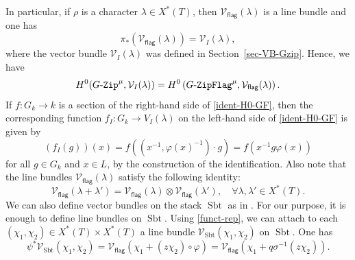 \documentclass[10pt,a4paper]{article}
\numberwithin{equation}{section}
\theoremstyle{definition}
\theoremstyle{remark}
\newcommand{\GZip}{\mathop{\text{$G$-{\tt Zip}}}\nolimits}
\newcommand{\flag}{\mathsf{flag}}
\newcommand{\GF}{\mathop{\text{$G$-{\tt ZipFlag}}}\nolimits}
\newcommand{\Vcal}{{\mathcal V}}
\DeclareMathOperator{\Sbt}{Sbt}
\begin{document}
In particular, if $\rho$ is a character $\lambda\in X^*(T)$, then $\Vcal_{\flag}(\lambda)$ is a line bundle and one has 
\begin{equation}\label{pushforward-lambda}
    \pi_*\left(\Vcal_{\flag}(\lambda)\right)=\Vcal_I(\lambda), 
\end{equation}
where the vector bundle $\Vcal_I(\lambda)$ was defined in Section~\ref{sec-VB-Gzip}. Hence, we have 
\begin{equation}\label{ident-H0-GF}
    H^0(\GZip^\mu,\Vcal_I(\lambda))=H^0\left(\GF^\mu,\Vcal_{\flag}(\lambda)\right).
\end{equation}
If $f \colon G_k \to k$ is a section of the right-hand side of \eqref{ident-H0-GF}, 
then the corresponding function 
$f_I \colon G_k \to V_I (\lambda)$ 
on the left-hand side of 
\eqref{ident-H0-GF} is given by 
\begin{equation}\label{eq:H0expid}
 (f_I (g))(x)=f \left(\left(x^{-1},\varphi(x)^{-1}\right) \cdot g\right)= 
 f\left(x^{-1} g \varphi (x)\right) 
\end{equation}
for all $g \in G_k$ and $x \in L$, by the construction of the identification. 
Also note  that the line bundles $\Vcal_{\flag}(\lambda)$ satisfy the following identity:
\begin{equation}\label{Vflag-additivity}
\Vcal_{\flag}(\lambda+\lambda')=\Vcal_{\flag}(\lambda)\otimes \Vcal_{\flag}(\lambda'), \quad \forall \lambda, \lambda'\in X^*(T).
\end{equation}
We can also define vector bundles on the stack $\Sbt$ as in \cite[Section~4]{Imai-Koskivirta-partial-Hasse}. For our purpose, it is enough to define line bundles on $\Sbt$. Using \eqref{funct-rep}, we can attach to each $(\chi_1,\chi_2)\in X^*(T)\times X^*(T)$ a line bundle $\Vcal_{\Sbt}(\chi_1,\chi_2)$ on $\Sbt$. One has
\begin{equation}\label{pullbackformula}
\psi^*\Vcal_{\Sbt}(\chi_1,\chi_2)=\Vcal_{\flag}(\chi_1+(z\chi_2)\circ \varphi)=\Vcal_{\flag}\left(\chi_1+q\sigma^{-1}(z\chi_2)\right).
\end{equation}
\end{document}
